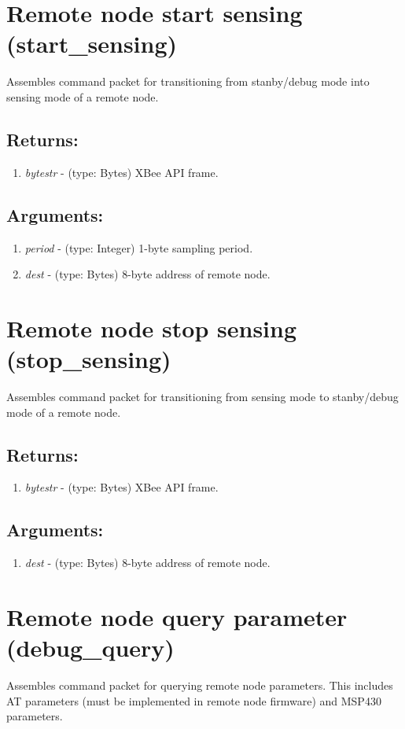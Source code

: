 \section{Remote node start sensing (start\_sensing)}
Assembles command packet for transitioning from stanby/debug mode into sensing mode of a remote node.
\subsection{Returns:}
\begin{enumerate}
\item \emph{bytestr} - (type: Bytes) XBee API frame.
\end{enumerate}
\subsection{Arguments:}
\begin{enumerate}
\item \emph{period} - (type: Integer) 1-byte sampling period.
\item \emph{dest} - (type: Bytes) 8-byte address of remote node.
\end{enumerate}

\section{Remote node stop sensing (stop\_sensing)}
Assembles command packet for transitioning from sensing mode to stanby/debug mode of a remote node.
\subsection{Returns:}
\begin{enumerate}
\item \emph{bytestr} - (type: Bytes) XBee API frame.
\end{enumerate}
\subsection{Arguments:}
\begin{enumerate}
\item \emph{dest} - (type: Bytes) 8-byte address of remote node.
\end{enumerate}

\section{Remote node query parameter (debug\_query)}
Assembles command packet for querying remote node parameters. This includes AT parameters (must be implemented in remote node firmware) and MSP430 parameters.

